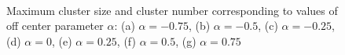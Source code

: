 \documentclass[../../master_thesis_np.tex]{subfiles}
\begin{document}
		\begin{figure}\ContinuedFloat
			\centering
			\\
			
			\caption{Maximum cluster size and cluster number corresponding to values of off center parameter $\alpha$: (a) $\alpha = -0.75$, (b) $\alpha = -0.5$, (c) $\alpha = -0.25$, (d) $\alpha = 0$, (e) $\alpha = 0.25$, (f) $\alpha = 0.5$, (g) $\alpha = 0.75$}
			\label{fig:lj_oc_clust}
		\end{figure}
		
\end{document}
